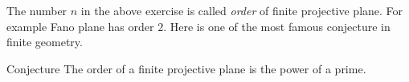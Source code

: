The number $n$ in the above exercise is called \emph{order} of finite projective plane.
For example Fano plane has order $2$.
Here is one of the most famous conjecture in finite geometry.

\begin{thm}{Conjecture}
The order of a finite projective plane is the power of a prime.
\end{thm}

